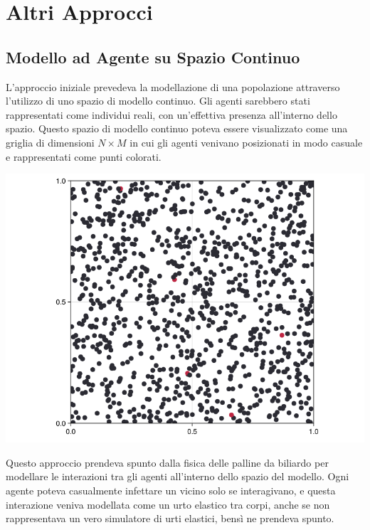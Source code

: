 \section{Altri Approcci}

\subsection{Modello ad Agente su Spazio Continuo}

L'approccio iniziale prevedeva la modellazione di una popolazione 
attraverso l'utilizzo di uno spazio di modello continuo. 
Gli agenti sarebbero stati rappresentati come individui reali, 
con un'effettiva presenza all'interno dello spazio. Questo spazio 
di modello continuo poteva essere visualizzato come una griglia di 
dimensioni $N \times M$ in cui gli agenti venivano posizionati in 
modo casuale e rappresentati come punti colorati.

\begin{minipage}{\linewidth}
    \centering
    \includegraphics[width=\textwidth]{img/ball-covid.png}
    \label{fig:ball_covid}
\end{minipage}

Questo approccio prendeva spunto dalla fisica delle palline da 
biliardo per modellare le interazioni tra gli agenti all'interno 
dello spazio del modello. Ogni agente poteva casualmente infettare 
un vicino solo se interagivano, e questa interazione veniva modellata 
come un urto elastico tra corpi, anche se non rappresentava un vero 
simulatore di urti elastici, bensì ne prendeva spunto.

